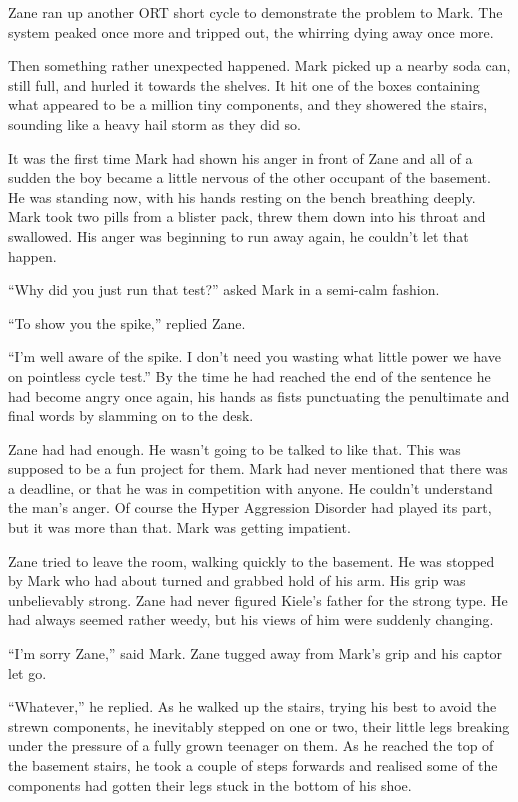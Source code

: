 Zane ran up another ORT short cycle to demonstrate the problem to Mark.  The system peaked once more and tripped out, the whirring dying away once more.  

Then something rather unexpected happened.  Mark picked up a nearby soda can, still full, and hurled it towards the shelves.  It hit one of the boxes containing what appeared to be a million tiny components, and they showered the stairs, sounding like a heavy hail storm as they did so.

It was the first time Mark had shown his anger in front of Zane and all of a sudden the boy became a little nervous of the other occupant of the basement.  He was standing now, with his hands resting on the bench breathing deeply.  Mark took two pills from a blister pack, threw them down into his throat and swallowed.  His anger was beginning to run away again, he couldn't let that happen.

``Why did you just run that test?'' asked Mark in a semi-calm fashion.

``To show you the spike,'' replied Zane.

``I'm well aware of the spike.  I don't need you wasting what little power we have on pointless cycle test.''  By the time he had reached the end of the sentence he had become angry once again, his hands as fists punctuating the penultimate and final words by slamming on to the desk.

Zane had had enough.  He wasn't going to be talked to like that.  This was supposed to be a fun project for them.  Mark had never mentioned that there was a deadline, or that he was in competition with anyone.  He couldn't understand the man's anger.  Of course the  Hyper Aggression Disorder had played its part, but it was more than that.  Mark was getting impatient.  

Zane tried to leave the room, walking quickly to the basement.  He was stopped by Mark who had about turned and grabbed hold of his arm.  His grip was unbelievably strong.  Zane had never figured Kiele's father for the strong type.  He had always seemed rather weedy, but his views of him were suddenly changing.

``I'm sorry Zane,'' said Mark.  Zane tugged away from Mark's grip and his captor let go.

``Whatever,'' he replied.  As he walked up the stairs, trying his best to avoid the strewn components, he inevitably stepped on one or two, their little legs breaking under the pressure of a fully grown teenager on them.  As he reached the top of the basement stairs, he took a couple of steps forwards and realised some of the components had gotten their legs stuck in the bottom of his shoe.

